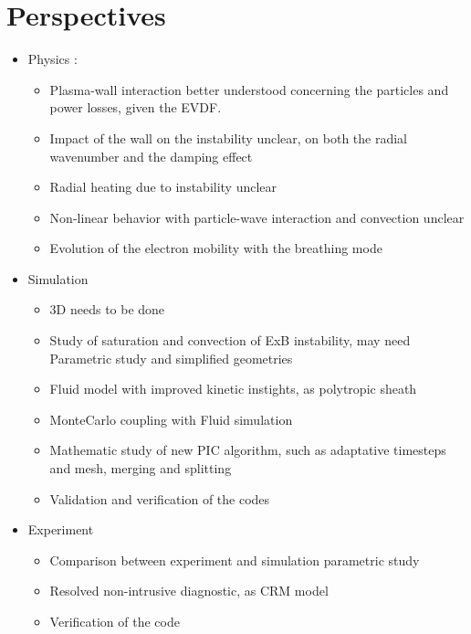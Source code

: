 \section{Perspectives}
\begin{itemize}
  \item Physics :
  \begin{itemize}
    \item Plasma-wall interaction better understood concerning the particles and power losses, given the EVDF. 
    \item Impact of the wall on the instability unclear, on both the radial wavenumber and the damping effect
    \item Radial heating due to instability unclear
    \item Non-linear behavior with particle-wave interaction and convection unclear
    \item Evolution of the electron mobility with the breathing mode
  \end{itemize}
  \item Simulation
  \begin{itemize}
    \item 3D needs to be done
    \item Study of saturation and convection of ExB instability, may need Parametric study and simplified geometries
    \item Fluid model with improved kinetic instights, as polytropic sheath
    \item MonteCarlo coupling with Fluid simulation
    \item Mathematic study of new PIC algorithm, such as adaptative timesteps and mesh, merging and splitting
    \item Validation and verification of the codes
  \end{itemize}
  \item Experiment
  \begin{itemize}
    \item Comparison between experiment and simulation parametric study
    \item Resolved non-intrusive diagnostic, as CRM model
    \item Verification of the code
  \end{itemize}
  
\end{itemize}
